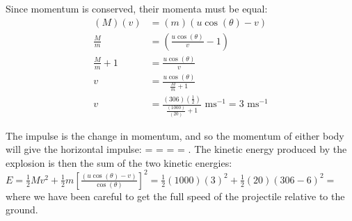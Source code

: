 \begin{problem}[A1972AMIIQ2l]
{\begin{enumerate}
Since momentum is conserved, their momenta must be equal:
\begin{align*} 
(M)(v) &= (m)(u \cos (\theta) - v) \\  
\frac{M}{m} &= \left( \frac{u \cos(\theta)}{v} - 1 \right) \\  
\frac{M}{m} + 1 &= \frac{u \cos(\theta)}{v} \\ 
v &= \frac{u \cos(\theta)}{\frac{M}{m} + 1} \\ 
v &= \frac{(306)(\frac{1}{2})}{\frac{(1000)}{(20)} + 1} \text{ ms}^{-1} = 3 \text{ ms}^{-1}
 \end{align*}

The impulse is the change in momentum, and so the momentum of either body will give the horizontal impulse:  =  =  =  = .
The kinetic energy produced by the explosion is then the sum of the two kinetic energies: $E = \frac{1}{2}Mv^{2} + \frac{1}{2}m\left[\frac{(u \cos(\theta) - v)}{\cos(\theta)}\right]^{2} = \frac{1}{2}(1000)(3)^{2} + \frac{1}{2}(20)(306 - 6)^{2} =$  where we have been careful to get the full speed of the projectile relative to the ground.


\end{enumerate}}
\end{problem}
